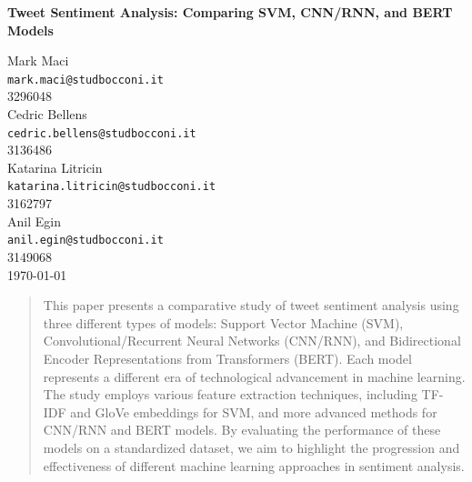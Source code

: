 \documentclass[12pt]{article}
\begin{document}
\begin{titlepage}
    \centering
    \vspace*{1in}
    
    \large
    \textbf{Tweet Sentiment Analysis: Comparing SVM, CNN/RNN, and BERT Models}

    
    \vspace{0.5in}
    Mark Maci \\
    \texttt{mark.maci@studbocconi.it} \\
    3296048\\
    
    \vspace{0.5in}
    Cedric Bellens \\
    \texttt{cedric.bellens@studbocconi.it} \\
    3136486 \\

    \vspace{0.5in}
    Katarina Litricin \\
    \texttt{katarina.litricin@studbocconi.it} \\
    3162797 \\
    
    \vspace{0.5in}
    Anil Egin \\
    \texttt{anil.egin@studbocconi.it} \\
    3149068 \\
    
    \vfill
    \large
    \today
    
\end{titlepage}

\begin{abstract}
This paper presents a comparative study of tweet sentiment analysis using three different types of models: Support Vector Machine (SVM), Convolutional/Recurrent Neural Networks (CNN/RNN), and Bidirectional Encoder Representations from Transformers (BERT). Each model represents a different era of technological advancement in machine learning. The study employs various feature extraction techniques, including TF-IDF and GloVe embeddings for SVM, and more advanced methods for CNN/RNN and BERT models. By evaluating the performance of these models on a standardized dataset, we aim to highlight the progression and effectiveness of different machine learning approaches in sentiment analysis.
\end{abstract}
    
\end{document}
